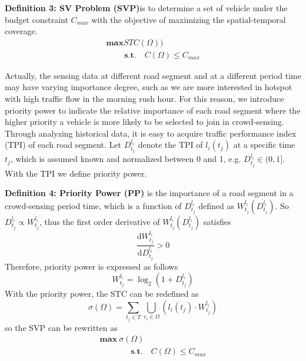 \documentclass[journal]{IEEEtran}
\begin{document}
 \noindent
 \textbf{Definition 3: SV Problem (SVP)}is to determine a set of vehicle under the budget constraint $C_{max}$ with the objective of maximizing the spatial-temporal coverage.
 \begin{equation}
 \begin{matrix}
 \textbf{max}STC(\Omega ))\\\quad\quad\
 \textbf{s.t.}\quad C(\Omega)\leqslant C_{max}\end{matrix}
 \end{equation}

 Actually, the sensing data at different road segment and at a different period time may have varying importance degree, such as we are more interested in hotspot with high traffic flow in the morning rush hour. For this reason, we introduce priority power to indicate the relative importance of each road segment where the higher priority a vehicle is more likely to be selected to join in crowd-sensing. Through analyzing historical data, it is easy to acquire traffic performance index (TPI) of each road segment. Let $D_{t_{j}}^{l_{i}}$ denote the TPI of $l_{i} (t_{j})$ at a specific time $t_{j}$, which is assumed known and normalized between 0 and 1, e.g. $D_{t_{j}}^{l_{i}}\in (0,1]$. With the TPI we define priority power.
 
 \noindent
 \textbf{Definition 4: Priority Power (PP)} is the importance of a road segment in a crowd-sensing period time, which is a function of  $D_{t_{j}}^{l_{i}}$ defined as $W_{t_{j}}^{l_{i}}(D_{t_{j}}^{l_{i}})$. So $D_{t_{j}}^{l_{i}}\propto W_{t_{j}}^{l_{i}}$, thus the first order derivative of $W_{t_{j}}^{l_{i}}(D_{t_{j}}^{l_{i}})$ satisfies
 \begin{equation}
	\frac{\mathrm{d}W_{t_{j}}^{l_{i}} }{\mathrm{d}D_{t_{j}}^{l_{i}}}> 0
 \end{equation}
Therefore, priority power is expressed as follows
\begin{equation}
W_{t_{j}}^{l_{i}}=\log_{2}(1+D_{t_{j}}^{l_{i}})
\end{equation}
With the priority power, the STC can be redefined as
\begin{equation}
\sigma (\Omega )=\sum_{t_{j}\in T}\bigcup_{v_{i}\in \Omega }(l_{i}(t_{j})\cdot W_{t_{j}}^{l_{i}})
\end{equation}
 so the SVP can be rewritten as
  \begin{equation}
  \begin{matrix}
  \textbf{max}\  \sigma(\Omega)\\\quad\quad\quad\;\;\
  \textbf{s.t.}\quad C(\Omega)\leqslant C_{max}\end{matrix}
  \end{equation}
  
\end{document}
